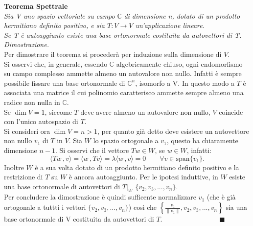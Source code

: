 \documentclass{article}
\begin{document}
\LARGE \textbf{Teorema Spettrale}\normalsize\vspace{.5cm}\\
\emph{Sia V uno spazio vettoriale su campo} $\mathbb{C}$ \emph{di dimensione n, dotato di un prodotto hermitiano definito positivo, e sia $T:V\rightarrow V$ un'applicazione lineare.\\ Se T è autoaggiunto esiste una base ortonormale costituita da autovettori di T.}\\

\emph{\large Dimostrazione. }\normalsize\vspace{.2cm}\\
Per dimostrare il teorema si procederà per induzione sulla dimensione di $V$.\\ Si osservi che, in generale, essendo $\mathbb{C}$ algebricamente chiuso, ogni endomorfismo su campo complesso ammette almeno un autovalore non nullo. Infatti è sempre possibile fissare una base ortonormale di $\mathbb{C} ^n$, isomorfo a V. In questo modo a $T$ è associata una matrice il cui polinomio caratterisco ammette sempre almeno una radice non nulla in $\mathbb{C} $.\\

Se $\dim V=1$, siccome $T$ deve avere almeno un autovalore non nullo, $V$ coincide con l'unico autospazio di $T$.\\

Si consideri ora $\dim V=n>1$, per quanto già detto deve esistere un autovettore non nullo $v_1$ di $T$ in $V$. Sia $W$ lo spazio ortogonale a $v_1$, questo ha chiaramente dimensione $n-1$. Si osservi che il vettore $Tw\in W$, se $w\in W$, infatti:
\begin{equation*}
    \langle Tw\,, v\rangle=\langle w\,, Tv\rangle=\lambda\langle w\,, v\rangle=0\qquad\forall v\in \text{span}\{v_1\}.
\end{equation*}
Inoltre $W$ è a sua volta dotato di un prodotto hermitiano definito positivo e la restrizione di $T$ su $W$ è ancora autoaggiunto. Per le ipotesi induttive, in $W$ esiste una base ortonormale di autovettori di $T\big|_{W}$ $\{v_2,v_3,...,v_n\}$.\\

Per concludere la dimostrazione è quindi sufficente normalizzare $v_1$ (che è già ortogonale a tuttti i vettori $\{v_2,v_3,...,v_n\}$) così che $\left\{\frac{v_1}{\|v_1\|},v_2,v_3,...,v_n\right\}$ sia una base ortonormale di V costituita da autovettori di $T$. $\qquad\qquad\qquad\qquad\blacksquare$
\newpage
\end{document}
